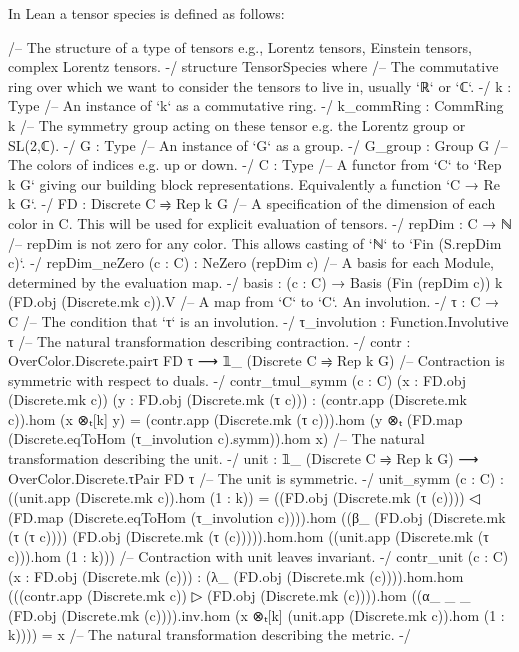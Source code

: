 \documentclass[a4paper, 11pt]{article}
\begin{document}
In Lean a tensor species is defined as follows:
\begin{codeLong}
/-- The structure of a type of tensors e.g., Lorentz tensors, Einstein tensors,
complex Lorentz tensors. -/
structure TensorSpecies where
  /-- The commutative ring  over which we want to consider the tensors to live in,
    usually `ℝ` or `ℂ`. -/
  k : Type
  /-- An instance of `k` as a commutative ring. -/
  k_commRing : CommRing k
  /-- The symmetry group acting on these tensor e.g. the Lorentz group or SL(2,ℂ). -/
  G : Type
  /-- An instance of `G` as a group. -/
  G_group : Group G
  /-- The colors of indices e.g. up or down. -/
  C : Type
  /-- A functor from `C` to `Rep k G` giving our building block representations.
    Equivalently a function `C → Re k G`. -/
  FD : Discrete C ⥤ Rep k G
  /-- A specification of the dimension of each color in C. This will be used for explicit
    evaluation of tensors. -/
  repDim : C → ℕ
  /-- repDim is not zero for any color. This allows casting of `ℕ` to `Fin (S.repDim c)`. -/
  repDim_neZero (c : C) : NeZero (repDim c)
  /-- A basis for each Module, determined by the evaluation map. -/
  basis : (c : C) → Basis (Fin (repDim c)) k (FD.obj (Discrete.mk c)).V
  /-- A map from `C` to `C`. An involution. -/
  τ : C → C
  /-- The condition that `τ` is an involution. -/
  τ_involution : Function.Involutive τ
  /-- The natural transformation describing contraction. -/
  contr : OverColor.Discrete.pairτ FD τ ⟶ 𝟙_ (Discrete C ⥤ Rep k G)
  /-- Contraction is symmetric with respect to duals. -/
  contr_tmul_symm (c : C) (x : FD.obj (Discrete.mk c))
      (y : FD.obj (Discrete.mk (τ c))) :
    (contr.app (Discrete.mk c)).hom (x ⊗ₜ[k] y) = (contr.app (Discrete.mk (τ c))).hom
    (y ⊗ₜ (FD.map (Discrete.eqToHom (τ_involution c).symm)).hom x)
  /-- The natural transformation describing the unit. -/
  unit : 𝟙_ (Discrete C ⥤ Rep k G) ⟶ OverColor.Discrete.τPair FD τ
  /-- The unit is symmetric. -/
  unit_symm (c : C) :
    ((unit.app (Discrete.mk c)).hom (1 : k)) =
    ((FD.obj (Discrete.mk (τ (c)))) ◁
      (FD.map (Discrete.eqToHom (τ_involution c)))).hom
    ((β_ (FD.obj (Discrete.mk (τ (τ c)))) (FD.obj (Discrete.mk (τ (c))))).hom.hom
    ((unit.app (Discrete.mk (τ c))).hom (1 : k)))
  /-- Contraction with unit leaves invariant. -/
  contr_unit (c : C) (x : FD.obj (Discrete.mk (c))) :
    (λ_ (FD.obj (Discrete.mk (c)))).hom.hom
    (((contr.app (Discrete.mk c)) ▷ (FD.obj (Discrete.mk (c)))).hom
    ((α_ _ _ (FD.obj (Discrete.mk (c)))).inv.hom
    (x ⊗ₜ[k] (unit.app (Discrete.mk c)).hom (1 : k)))) = x
  /-- The natural transformation describing the metric. -/

\end{codeLong}
\end{document}
